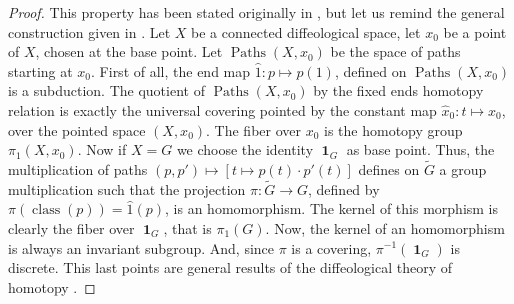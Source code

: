 \documentclass[10pt,reqno,twoside]{amsart}
\DeclareMathOperator{\id}{\mathbf{1}}
\DeclareMathOperator{\Paths}{Paths}
\DeclareMathOperator{\class}{class}
\newcommand{\but}{\hat{1}}
\theoremstyle{plain}
\theoremstyle{definition}
\begin{document}
  \begin{proof}
    This property has been stated originally in \cite{Sou84} \cite{Don84},
    but let us remind the general construction given in \cite{Igl85}.
    Let $X$ be a connected diffeological space,
    let $x_0$ be a point of $X$,
    chosen at the base point.
    Let $\Paths(X,x_0)$ be the space of paths starting at $x_0$.
    First of all,
    the end map $\but : p \mapsto p(1)$,
    defined on $\Paths(X,x_0)$ is a subduction.
    The quotient of $\Paths(X,x_0)$ by the fixed ends homotopy relation is exactly the universal covering pointed by the constant map $\hat x_0 : t \mapsto x_0$,
    over the pointed space $(X, x_0)$.
    The fiber over $x_0$ is the homotopy group $\pi_1(X, x_0)$.
    Now if $X = G$ we choose the identity $\id_G$ as base point.
    Thus,
    the multiplication of paths $(p,p') \mapsto [t \mapsto p(t) \cdot p'(t)]$ defines on $\tilde G$ a group multiplication such that the projection $\pi : \tilde G \to G$,
    defined by $\pi(\class(p)) = \but(p)$,
    is an homomorphism.
    The kernel of this morphism is clearly the fiber over $\id_G$,
    that is $\pi_1(G)$.
    Now,
    the kernel of an homomorphism is always an invariant subgroup.
    And,
    since $\pi$ is a covering,
    $\pi^{-1}(\id_G)$ is discrete.
    This last points are general results of the diffeological theory of homotopy \cite{Igl85}.
  \end{proof}
  
\end{document}
